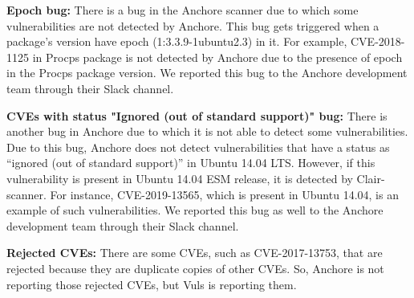 \documentclass[a4paper,num-refs]{oup-contemporary}
\begin{document}
\textbf{Epoch bug:} There is a bug in the Anchore scanner due to which some vulnerabilities are 
		not detected by Anchore. This bug gets triggered when a package’s version have epoch 
		(1:3.3.9-1ubuntu2.3) in it. For example, CVE-2018-1125 in Procps package is not
		detected by Anchore due to the presence of epoch in the Procps package version.
		We reported this bug to the Anchore development team through their Slack channel.

\textbf{CVEs with status "Ignored (out of standard support)" bug:} There is another bug in Anchore due to 
		which it is not able to detect some vulnerabilities. Due to this bug, Anchore does not detect 
		vulnerabilities that have a status as “ignored (out of standard support)” in Ubuntu 14.04 LTS. 
		However, if this vulnerability is present in Ubuntu 14.04 ESM release, it is detected by Clair-scanner. 
		For instance, CVE-2019-13565, which is present in Ubuntu 14.04, is an example of such vulnerabilities. 
		We reported this bug as well to the Anchore development team through their Slack
		channel.

\textbf{Rejected CVEs:} There are some CVEs, such as CVE-2017-13753, that are rejected because they are duplicate copies of other CVEs. 
	So, Anchore is not reporting those rejected CVEs, but Vuls is reporting them.
\end{document}
